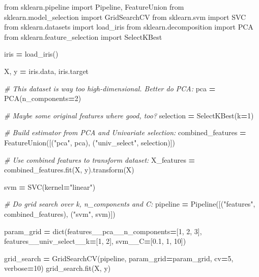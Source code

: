\documentclass[
]{scrbook}
\newenvironment{Shaded}{\begin{snugshade}}{\end{snugshade}}
\newcommand{\BuiltInTok}[1]{#1}
\newcommand{\CommentTok}[1]{\textcolor[rgb]{0.56,0.35,0.01}{\textit{#1}}}
\newcommand{\DecValTok}[1]{\textcolor[rgb]{0.00,0.00,0.81}{#1}}
\newcommand{\FloatTok}[1]{\textcolor[rgb]{0.00,0.00,0.81}{#1}}
\newcommand{\ImportTok}[1]{#1}
\newcommand{\NormalTok}[1]{#1}
\newcommand{\OperatorTok}[1]{\textcolor[rgb]{0.81,0.36,0.00}{\textbf{#1}}}
\newcommand{\StringTok}[1]{\textcolor[rgb]{0.31,0.60,0.02}{#1}}
\renewenvironment{Shaded} {\begin{snugshade}\small} {\end{snugshade}}
\begin{document}
\begin{Shaded}
\begin{Highlighting}[]
\ImportTok{from}\NormalTok{ sklearn.pipeline }\ImportTok{import}\NormalTok{ Pipeline, FeatureUnion}
\ImportTok{from}\NormalTok{ sklearn.model\_selection }\ImportTok{import}\NormalTok{ GridSearchCV}
\ImportTok{from}\NormalTok{ sklearn.svm }\ImportTok{import}\NormalTok{ SVC}
\ImportTok{from}\NormalTok{ sklearn.datasets }\ImportTok{import}\NormalTok{ load\_iris}
\ImportTok{from}\NormalTok{ sklearn.decomposition }\ImportTok{import}\NormalTok{ PCA}
\ImportTok{from}\NormalTok{ sklearn.feature\_selection }\ImportTok{import}\NormalTok{ SelectKBest}

\NormalTok{iris }\OperatorTok{=}\NormalTok{ load\_iris()}

\NormalTok{X, y }\OperatorTok{=}\NormalTok{ iris.data, iris.target}

\CommentTok{\# This dataset is way too high{-}dimensional. Better do PCA:}
\NormalTok{pca }\OperatorTok{=}\NormalTok{ PCA(n\_components}\OperatorTok{=}\DecValTok{2}\NormalTok{)}

\CommentTok{\# Maybe some original features where good, too?}
\NormalTok{selection }\OperatorTok{=}\NormalTok{ SelectKBest(k}\OperatorTok{=}\DecValTok{1}\NormalTok{)}

\CommentTok{\# Build estimator from PCA and Univariate selection:}
\NormalTok{combined\_features }\OperatorTok{=}\NormalTok{ FeatureUnion([(}\StringTok{"pca"}\NormalTok{, pca), (}\StringTok{"univ\_select"}\NormalTok{, selection)])}

\CommentTok{\# Use combined features to transform dataset:}
\NormalTok{X\_features }\OperatorTok{=}\NormalTok{ combined\_features.fit(X, y).transform(X)}

\NormalTok{svm }\OperatorTok{=}\NormalTok{ SVC(kernel}\OperatorTok{=}\StringTok{"linear"}\NormalTok{)}

\CommentTok{\# Do grid search over k, n\_components and C:}
\NormalTok{pipeline }\OperatorTok{=}\NormalTok{ Pipeline([(}\StringTok{"features"}\NormalTok{, combined\_features), (}\StringTok{"svm"}\NormalTok{, svm)])}

\NormalTok{param\_grid }\OperatorTok{=} \BuiltInTok{dict}\NormalTok{(features\_\_pca\_\_n\_components}\OperatorTok{=}\NormalTok{[}\DecValTok{1}\NormalTok{, }\DecValTok{2}\NormalTok{, }\DecValTok{3}\NormalTok{],}
\NormalTok{                  features\_\_univ\_select\_\_k}\OperatorTok{=}\NormalTok{[}\DecValTok{1}\NormalTok{, }\DecValTok{2}\NormalTok{],}
\NormalTok{                  svm\_\_C}\OperatorTok{=}\NormalTok{[}\FloatTok{0.1}\NormalTok{, }\DecValTok{1}\NormalTok{, }\DecValTok{10}\NormalTok{])}

\NormalTok{grid\_search }\OperatorTok{=}\NormalTok{ GridSearchCV(pipeline, param\_grid}\OperatorTok{=}\NormalTok{param\_grid, cv}\OperatorTok{=}\DecValTok{5}\NormalTok{, verbose}\OperatorTok{=}\DecValTok{10}\NormalTok{)}
\NormalTok{grid\_search.fit(X, y)}
\end{Highlighting}
\end{Shaded}
\end{document}
